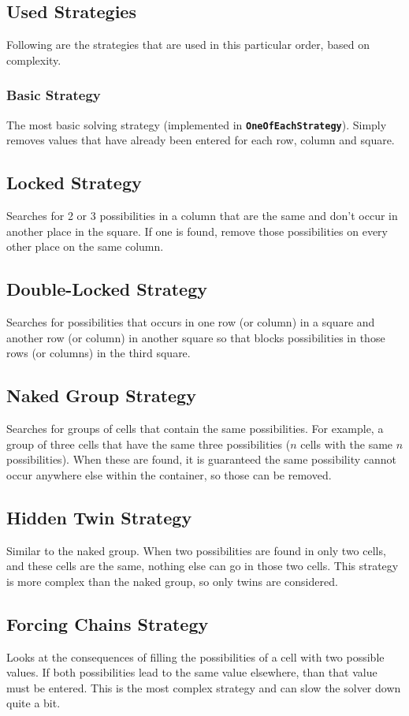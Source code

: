 \documentclass[11pt, a4paper, fleqn]{article}
\newcommand{\class}[1]{{\color{class}\textbf{\lstinline{#1}}}}
\begin{document}
\subsection{Used Strategies}
Following are the strategies that are used in this particular order, based on complexity.
\subsubsection{Basic Strategy}
The most basic solving strategy (implemented in \class{OneOfEachStrategy}). Simply removes
values that have already been entered for each row, column and square.
\subsection{Locked Strategy}
Searches for 2 or 3 possibilities in a column that are the same and don't 
occur in another place in the square. If one is found, remove those possibilities on 
every other place on the same column.
\subsection{Double-Locked Strategy}
Searches for possibilities that occurs in one row (or column) in a square
and another row (or column) in another square so that blocks possibilities
in those rows (or columns) in the third square.
\subsection{Naked Group Strategy}
Searches for groups of cells that contain the same possibilities. For example,
a group of three cells that have the same three possibilities ($n$ cells with the same $n$ possibilities). 
When these are found, it is guaranteed the same possibility cannot occur anywhere else within the container,
so those can be removed.
\subsection{Hidden Twin Strategy}
Similar to the naked group. When two possibilities are found in only two cells, and these cells are the same,
nothing else can go in those two cells. This strategy is more complex than the naked group, so only twins are
considered.
\subsection{Forcing Chains Strategy}
Looks at the consequences of filling the possibilities of a cell with two possible values.
If both possibilities lead to the same value elsewhere, than that value must be entered. This is the most
complex strategy and can slow the solver down quite a bit.
\end{document}
